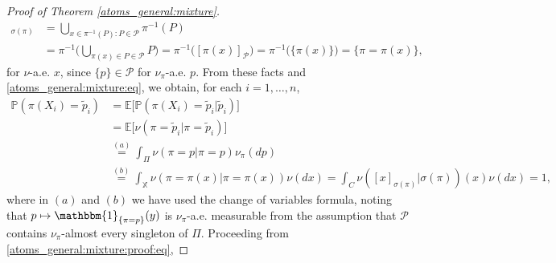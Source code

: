 \documentclass[a4paper]{article}
\theoremstyle{plain}
\theoremstyle{remark}
\theoremstyle{definition}
\begin{document}
\begin{proof}[Proof of Theorem \ref{atoms_general:mixture}]
\begingroup\allowdisplaybreaks
\begin{align*}
[x]_{\sigma(\pi)}&=\bigcup_{x\in\pi^{-1}(P):P\in\mathcal{P}}\pi^{-1}(P)\\
&=\pi^{-1}\biggl(\bigcup_{\pi(x)\in P\in\mathcal{P}}P\biggr)=\pi^{-1}\bigl([\pi(x)]_{\mathcal{P}}\bigr)=\pi^{-1}\bigl(\{\pi(x)\}\bigr)=\{\pi=\pi(x)\},
\end{align*}
\endgroup
for $\nu$-a.e. $x$, since $\{p\}\in\mathcal{P}$ for $\nu_\pi$-a.e. $p$. From these facts and \eqref{atoms_general:mixture:eq}, we obtain, for each $i=1,\ldots,n$,
\begingroup\allowdisplaybreaks
\begin{align*}
\mathbb{P}(\pi(X_i)=\tilde{p}_i)&=\mathbb{E}\bigl[\mathbb{P}(\pi(X_i)=\tilde{p}_i|\tilde{p}_i)\bigr]\\
&=\mathbb{E}\bigl[\nu(\pi=\tilde{p}_i|\pi=\tilde{p}_i)\bigr]\\
&\overset{(a)}{=}\int_\Pi\nu(\pi=p|\pi=p)\nu_\pi(dp)\\
&\overset{(b)}{=}\int_\mathbb{X}\nu(\pi=\pi(x)|\pi=\pi(x))\nu(dx)=\int_C\nu([x]_{\sigma(\pi)}|\sigma(\pi))(x)\nu(dx)=1,
\end{align*}
\endgroup
where in $(a)$ and $(b)$ we have used the change of variables formula, noting that $p\mapsto\mathbbm{1}_{\{\pi=p\}}(y)$ is $\nu_\pi$-a.e. measurable from the assumption that $\mathcal{P}$ contains $\nu_\pi$-almost every singleton of $\Pi$. Proceeding from \eqref{atoms_general:mixture:proof:eq},

\end{proof}
\end{document}
